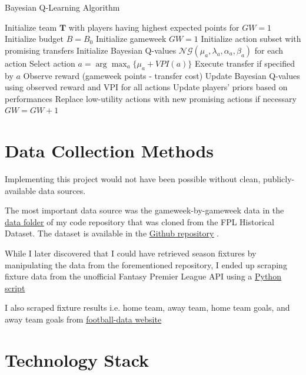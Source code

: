 \begin{algorithm}
\caption{Bayesian Q-Learning Algorithm}
\begin{algorithmic}[1]
\State Initialize team $\mathbf{T}$ with players having highest expected points for $GW = 1$
\State Initialize budget $B = B_0$
\State Initialize gameweek $GW = 1$
\State Initialize action subset with promising transfers
\State Initialize Bayesian Q-values $\mathcal{NG}(\mu_a, \lambda_a, \alpha_a, \beta_a)$ for each action
    \State Select action $a = \arg\max_a \{\mu_a + VPI(a)\}$ 
    \State Execute transfer if specified by $a$
    \State Observe reward (gameweek points - transfer cost)
    \State Update Bayesian Q-values using observed reward and VPI for all actions
    \State Update players' priors based on performances
    \State Replace low-utility actions with new promising actions if necessary
    \State $GW = GW + 1$
\EndWhile
\end{algorithmic}
\label{alg:bayesianQLearning}
\end{algorithm}

\section{Data Collection Methods}
Implementing this project would not have been possible without clean, publicly-available data sources. 

The most important data source was the gameweek-by-gameweek data in the \href{https://github.com/MUN3N3Z/FPL_AI/tree/main/data}{\underline{data folder}} of my code repository that was cloned from the FPL Historical Dataset. The dataset is available in the \href{https://github.com/vaastav/Fantasy-Premier-League/tree/master}{\underline{Github repository}} \cite{anand2016fantasypremierleague}.

While I later discovered that I could have retrieved season fixtures by manipulating the data from the forementioned repository, I ended up scraping fixture data from the unofficial Fantasy Premier League API using a \href{https://github.com/MUN3N3Z/FPL_AI/tree/main/scripts/save_season_fixtures.py}{\underline{Python script}}

I also scraped fixture results i.e. home team, away team, home team goals, and away team goals from \href{www.football-data.co.uk}{football-data website}

\section{Technology Stack}
